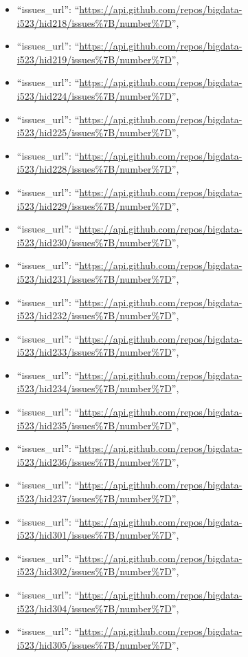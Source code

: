 \begin{itemize}
\item
  ``issues\_url'':
  ``\url{https://api.github.com/repos/bigdata-i523/hid218/issues\%7B/number\%7D}'',
\item
  ``issues\_url'':
  ``\url{https://api.github.com/repos/bigdata-i523/hid219/issues\%7B/number\%7D}'',
\item
  ``issues\_url'':
  ``\url{https://api.github.com/repos/bigdata-i523/hid224/issues\%7B/number\%7D}'',
\item
  ``issues\_url'':
  ``\url{https://api.github.com/repos/bigdata-i523/hid225/issues\%7B/number\%7D}'',
\item
  ``issues\_url'':
  ``\url{https://api.github.com/repos/bigdata-i523/hid228/issues\%7B/number\%7D}'',
\item
  ``issues\_url'':
  ``\url{https://api.github.com/repos/bigdata-i523/hid229/issues\%7B/number\%7D}'',
\item
  ``issues\_url'':
  ``\url{https://api.github.com/repos/bigdata-i523/hid230/issues\%7B/number\%7D}'',
\item
  ``issues\_url'':
  ``\url{https://api.github.com/repos/bigdata-i523/hid231/issues\%7B/number\%7D}'',
\item
  ``issues\_url'':
  ``\url{https://api.github.com/repos/bigdata-i523/hid232/issues\%7B/number\%7D}'',
\item
  ``issues\_url'':
  ``\url{https://api.github.com/repos/bigdata-i523/hid233/issues\%7B/number\%7D}'',
\item
  ``issues\_url'':
  ``\url{https://api.github.com/repos/bigdata-i523/hid234/issues\%7B/number\%7D}'',
\item
  ``issues\_url'':
  ``\url{https://api.github.com/repos/bigdata-i523/hid235/issues\%7B/number\%7D}'',
\item
  ``issues\_url'':
  ``\url{https://api.github.com/repos/bigdata-i523/hid236/issues\%7B/number\%7D}'',
\item
  ``issues\_url'':
  ``\url{https://api.github.com/repos/bigdata-i523/hid237/issues\%7B/number\%7D}'',
\item
  ``issues\_url'':
  ``\url{https://api.github.com/repos/bigdata-i523/hid301/issues\%7B/number\%7D}'',
\item
  ``issues\_url'':
  ``\url{https://api.github.com/repos/bigdata-i523/hid302/issues\%7B/number\%7D}'',
\item
  ``issues\_url'':
  ``\url{https://api.github.com/repos/bigdata-i523/hid304/issues\%7B/number\%7D}'',
\item
  ``issues\_url'':
  ``\url{https://api.github.com/repos/bigdata-i523/hid305/issues\%7B/number\%7D}'',

\end{itemize}
